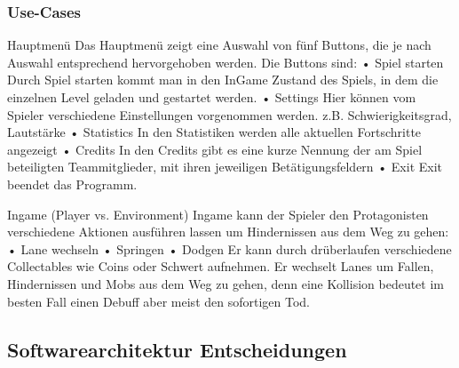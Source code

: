 \documentclass{article}
\begin{document}
\newpage

\subsubsection{Use-Cases}


Hauptmenü\newline
Das Hauptmenü zeigt eine Auswahl von fünf Buttons, die je nach Auswahl entsprechend hervorgehoben werden.
 Die Buttons sind:\newline
• Spiel starten\newline
Durch Spiel starten kommt man in den InGame Zustand des Spiels, in dem die einzelnen Level geladen und gestartet werden. \newline
• Settings \newline
Hier können vom Spieler verschiedene Einstellungen vorgenommen werden.
z.B. Schwierigkeitsgrad, Lautstärke \newline
• Statistics \newline
In den Statistiken werden alle aktuellen Fortschritte angezeigt \newline
• Credits \newline
In den Credits gibt es eine kurze Nennung der am Spiel beteiligten Teammitglieder, mit ihren jeweiligen Betätigungsfeldern \newline
• Exit\newline
Exit beendet das Programm. \newline




\noindent Ingame (Player vs. Environment)\newline
Ingame kann der Spieler den Protagonisten verschiedene Aktionen ausführen lassen um
Hindernissen aus dem Weg zu gehen:\newline
• Lane wechseln\newline
• Springen\newline
• Dodgen\newline
Er kann durch drüberlaufen verschiedene Collectables wie Coins oder Schwert aufnehmen.
Er wechselt Lanes um Fallen, Hindernissen und Mobs aus dem Weg zu gehen, denn eine Kollision
bedeutet im besten Fall einen Debuff aber meist den sofortigen Tod. \newline


\subsection{Softwarearchitektur Entscheidungen}
\end{document}

